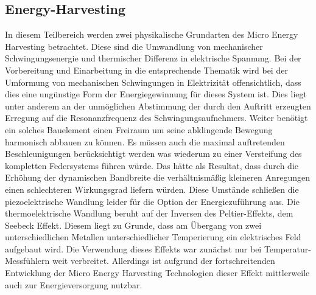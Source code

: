 \documentclass[12pt]{scrreprt} %
\begin{document}
\subsection{Energy-Harvesting}
In diesem Teilbereich werden zwei physikalische Grundarten des Micro Energy Harvesting betrachtet. Diese sind die Umwandlung von mechanischer Schwingungsenergie und thermischer Differenz in elektrische Spannung. Bei der Vorbereitung und Einarbeitung in die entsprechende Thematik wird bei der Umformung von mechanischen Schwingungen in Elektrizität offensichtlich, dass dies eine ungünstige Form der Energiegewinnung für dieses System ist. Dies liegt unter anderem an der unmöglichen Abstimmung der durch den Auftritt erzeugten Erregung auf die Resonanzfrequenz des Schwingungsaufnehmers. Weiter benötigt ein solches Bauelement einen Freiraum um seine abklingende Bewegung harmonisch abbauen zu können. Es müssen auch die maximal auftretenden Beschleunigungen berücksichtigt werden was wiederum zu einer Versteifung des kompletten Federsystems führen würde. Das hätte als Resultat, dass durch die Erhöhung der dynamischen Bandbreite die verhältnismäßig kleineren Anregungen einen schlechteren Wirkungsgrad liefern würden. Diese Umstände schließen die piezoelektrische Wandlung leider für die Option der Energiezuführung aus. \citep[vgl. S.39]{Dembowski2011} \newline 
Die thermoelektrische Wandlung beruht auf der Inversen des Peltier-Effekts, dem Seebeck Effekt. Diesem liegt zu Grunde, dass am Übergang von zwei unterschiedlichen Metallen unterschiedlicher Temperierung ein elektrisches Feld aufgebaut wird. Die Verwendung dieses Effekts war zunächst nur bei Temperatur-Messfühlern weit verbreitet. Allerdings ist aufgrund der fortschreitenden Entwicklung der Micro Energy Harvesting Technologien dieser Effekt mittlerweile auch zur Energieversorgung nutzbar. \newline \newline
\end{document}
